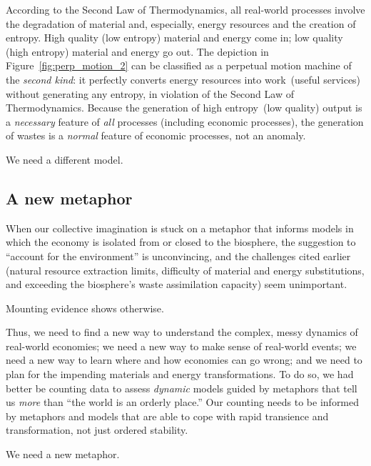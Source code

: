 According to the Second Law of Thermodynamics,
all real-world processes involve the degradation
of material and, especially, energy resources
and the creation of entropy.
High quality (low entropy) material and energy come in;
low quality (high entropy) material and energy go out.
The depiction in Figure~\ref{fig:perp_motion_2} 
can be classified as a perpetual motion machine
of the \emph{second kind}:
it perfectly converts energy resources into 
work~(useful services) without generating
any entropy,
in violation of the Second Law of Thermodynamics.
Because the generation of high entropy~(low quality)
output is a \emph{necessary} feature of \emph{all} processes 
(including economic processes),
the generation of wastes is a \emph{normal} feature of
economic processes,
not an anomaly.

We need a different model.


\subsection{A new metaphor}
\label{sec:new_metaphor}

When our collective imagination is stuck on a metaphor that 
informs models in which the economy is isolated from or closed to the biosphere,
the suggestion to ``account for the environment'' is unconvincing, and 
the challenges cited earlier (natural resource extraction limits,
difficulty of material and energy substitutions, and 
exceeding the biosphere's waste assimilation capacity)
seem unimportant. 

Mounting evidence shows otherwise.

Thus, we need to find a new way to understand the complex, 
messy dynamics of real-world economies;
we need a new way to make sense of real-world events;
we need a new way to learn where and how economies can go wrong; and
we need to plan for the impending materials and energy transformations.
To do so, we had better be counting data to assess \emph{dynamic} models
guided by metaphors that tell us \emph{more} than ``the world is an orderly place.''
Our counting needs to be informed by metaphors and models that are
able to cope with rapid transience and transformation,
not just ordered stability.

We need a new metaphor.


